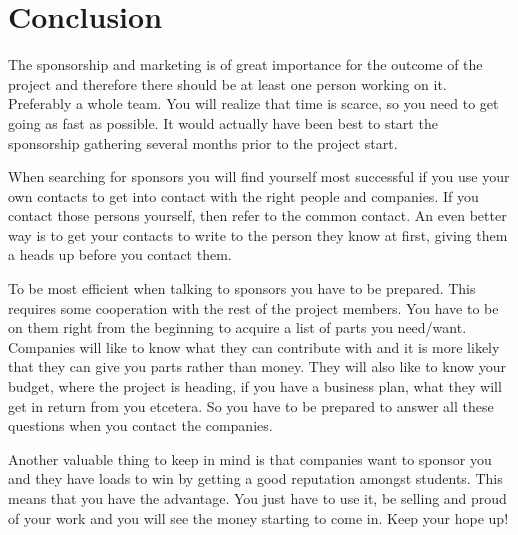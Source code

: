 \section{Conclusion}\label{sec:conclusion}
The sponsorship and marketing is of great importance for the outcome of the project and therefore there should be at least one person working on it. Preferably a whole team. You will realize that time is scarce, so you need to get going as fast as possible. It would actually have been best to start the sponsorship gathering several months prior to the project start.

When searching for sponsors you will find yourself most successful if you use your own contacts to get into contact with the right people and companies. If you contact those persons yourself, then refer to the common contact. An even better way is to get your contacts to write to the person they know at first, giving them a heads up before you contact them.

To be most efficient when talking to sponsors you have to be prepared. This requires some cooperation with the rest of the project members. You have to be on them right from the beginning to acquire a list of parts you need/want. Companies will like to know what they can contribute with and it is more likely that they can give you parts rather than money. They will also like to know your budget, where the project is heading, if you have a business plan, what they will get in return from you etcetera. So you have to be prepared to answer all these questions when you contact the companies.

Another valuable thing to keep in mind is that companies want to sponsor you and they have loads to win by getting a good reputation amongst students. This means that you have the advantage. You just have to use it, be selling and proud of your work and you will see the money starting to come in. Keep your hope up!